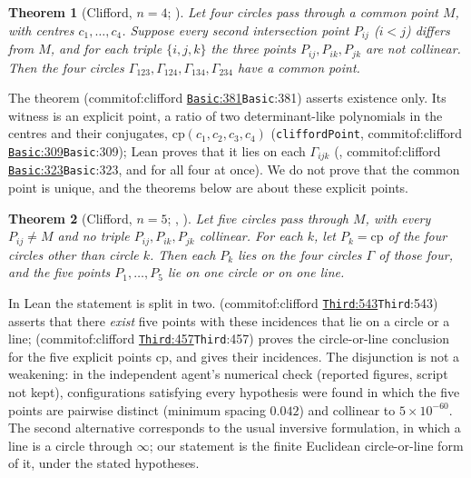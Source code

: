 \documentclass[11pt]{article}
\newtheorem{theorem}{Theorem}
\theoremstyle{definition}
\theoremstyle{remark}
\newcommand{\lean}[1]{\texttt{#1}}
\newcommand{\commitof}[1]{\csname commitof:#1\endcsname}
\newcommand{\repo}[1]{https://github.com/jpbald93/#1}
\newcommand{\src}[4]{\ifcsname commitof:#1\endcsname
  \href{\repo{#1}/blob/\commitof{#1}/#2/#3.lean\#L#4}{\texttt{#3}:#4}\else\texttt{#3}:#4\fi}
\begin{document}
\begin{theorem}[Clifford, $n=4$; ]\label{thm:cliff4}
Let four circles pass through a common point $M$, with centres $c_1,\dots,c_4$. Suppose every
second intersection point $P_{ij}$ ($i<j$) differs from $M$, and for each triple $\{i,j,k\}$ the
three points $P_{ij},P_{ik},P_{jk}$ are not collinear. Then the four circles
$\Gamma_{123},\Gamma_{124},\Gamma_{134},\Gamma_{234}$ have a common point.
\end{theorem}

The theorem (\src{clifford}{Clifford}{Basic}{381}) asserts existence only. Its witness is an explicit
point, a ratio of two determinant-like polynomials in the centres and their conjugates,
$\mathrm{cp}(c_1,c_2,c_3,c_4)$ (\lean{cliffordPoint}, \src{clifford}{Clifford}{Basic}{309}); Lean proves
that it lies on each $\Gamma_{ijk}$ (, \src{clifford}{Clifford}{Basic}{323},
and  for all four at once). We do not prove that the common point
is unique, and the theorems below are about these explicit points.

\begin{theorem}[Clifford, $n=5$; , ]\label{thm:cliff5}
Let five circles pass through $M$, with every $P_{ij}\neq M$ and no triple $P_{ij},P_{ik},P_{jk}$
collinear. For each $k$, let $P_k=\mathrm{cp}$ of the four circles other than circle $k$. Then each
$P_k$ lies on the four circles $\Gamma$ of those four, and the five points $P_1,\dots,P_5$ lie on one
circle or on one line.
\end{theorem}

In Lean the statement is split in two.  (\src{clifford}{Clifford}{Third}{543})
asserts that there \emph{exist} five points with these incidences that lie on a circle or a line;
 (\src{clifford}{Clifford}{Third}{457}) proves the circle-or-line
conclusion for the five explicit points $\mathrm{cp}$, and  gives
their incidences. The disjunction is not a weakening: in the independent agent's numerical check (reported figures, script not kept), configurations
satisfying every hypothesis were found in which the five points are pairwise distinct (minimum spacing
$0.042$) and collinear to $5\times10^{-60}$. The second alternative corresponds to the usual inversive
formulation, in which a line is a circle through $\infty$; our statement is the finite Euclidean
circle-or-line form of it, under the stated hypotheses.
\end{document}
